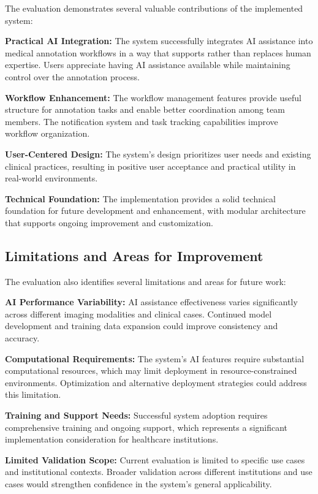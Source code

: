 The evaluation demonstrates several valuable contributions of the implemented system:

\textbf{Practical AI Integration:} The system successfully integrates AI assistance into medical annotation workflows in a way that supports rather than replaces human expertise. Users appreciate having AI assistance available while maintaining control over the annotation process.

\textbf{Workflow Enhancement:} The workflow management features provide useful structure for annotation tasks and enable better coordination among team members. The notification system and task tracking capabilities improve workflow organization.

\textbf{User-Centered Design:} The system's design prioritizes user needs and existing clinical practices, resulting in positive user acceptance and practical utility in real-world environments.

\textbf{Technical Foundation:} The implementation provides a solid technical foundation for future development and enhancement, with modular architecture that supports ongoing improvement and customization.

\subsection{Limitations and Areas for Improvement}

The evaluation also identifies several limitations and areas for future work:

\textbf{AI Performance Variability:} AI assistance effectiveness varies significantly across different imaging modalities and clinical cases. Continued model development and training data expansion could improve consistency and accuracy.

\textbf{Computational Requirements:} The system's AI features require substantial computational resources, which may limit deployment in resource-constrained environments. Optimization and alternative deployment strategies could address this limitation.

\textbf{Training and Support Needs:} Successful system adoption requires comprehensive training and ongoing support, which represents a significant implementation consideration for healthcare institutions.

\textbf{Limited Validation Scope:} Current evaluation is limited to specific use cases and institutional contexts. Broader validation across different institutions and use cases would strengthen confidence in the system's general applicability.

